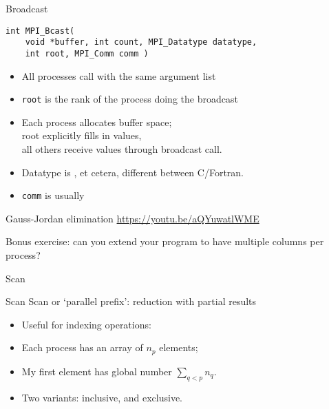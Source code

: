 \begin{numberedframe}{Broadcast}
\begin{lstlisting}
int MPI_Bcast(
    void *buffer, int count, MPI_Datatype datatype, 
    int root, MPI_Comm comm )
\end{lstlisting}
\begin{itemize}
\item All processes call with the same argument list
\item \lstinline{root} is the rank of the process doing the broadcast
\item Each process allocates buffer space;\\
  root explicitly fills in values,\\
  all others receive values through broadcast call.
\item Datatype is ,  et cetera, different
  between C/Fortran.
\item \lstinline{comm} is usually 
\end{itemize}
\end{numberedframe}

\begin{numberedframe}{Gauss-Jordan elimination}
  \url{https://youtu.be/aQYuwatlWME}
\end{numberedframe}


\begin{exerciseframe}[jordan]
  \small
  
\end{exerciseframe}

\begin{optexerciseframe}
  Bonus exercise: can you extend your program to have multiple columns
  per process?
\end{optexerciseframe}

 {Scan}

\begin{numberedframe}{Scan}
Scan or `parallel prefix': reduction with partial results

\begin{itemize}
\item Useful for indexing operations:
\item Each process has an array of $n_p$ elements;
\item My first element has global number $\sum_{q<p}n_q$.
\item Two variants:  inclusive, and
   exclusive.
\end{itemize}
\end{numberedframe}

